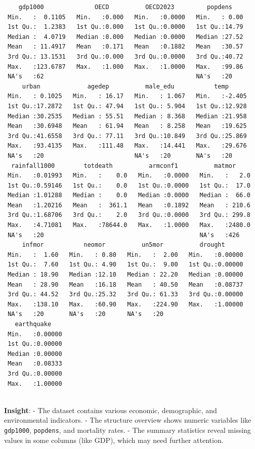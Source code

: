 \documentclass[
  letterpaper,
  DIV=11,
  numbers=noendperiod]{scrartcl}
\begin{document}
\begin{verbatim}
    gdp1000              OECD          OECD2023         popdens     
 Min.   :  0.1105   Min.   :0.000   Min.   :0.0000   Min.   : 0.00  
 1st Qu.:  1.2383   1st Qu.:0.000   1st Qu.:0.0000   1st Qu.:14.79  
 Median :  4.0719   Median :0.000   Median :0.0000   Median :27.52  
 Mean   : 11.4917   Mean   :0.171   Mean   :0.1882   Mean   :30.57  
 3rd Qu.: 13.1531   3rd Qu.:0.000   3rd Qu.:0.0000   3rd Qu.:40.72  
 Max.   :123.6787   Max.   :1.000   Max.   :1.0000   Max.   :99.86  
 NA's   :62                                          NA's   :20     
     urban             agedep          male_edu           temp       
 Min.   : 0.1025   Min.   : 16.17   Min.   : 1.067   Min.   :-2.405  
 1st Qu.:17.2872   1st Qu.: 47.94   1st Qu.: 5.904   1st Qu.:12.928  
 Median :30.2535   Median : 55.51   Median : 8.368   Median :21.958  
 Mean   :30.6948   Mean   : 61.94   Mean   : 8.258   Mean   :19.625  
 3rd Qu.:41.6558   3rd Qu.: 77.11   3rd Qu.:10.849   3rd Qu.:25.869  
 Max.   :93.4135   Max.   :111.48   Max.   :14.441   Max.   :29.676  
 NA's   :20                         NA's   :20       NA's   :20      
  rainfall1000        totdeath          armconf1          matmor      
 Min.   :0.01993   Min.   :    0.0   Min.   :0.0000   Min.   :   2.0  
 1st Qu.:0.59146   1st Qu.:    0.0   1st Qu.:0.0000   1st Qu.:  17.0  
 Median :1.01288   Median :    0.0   Median :0.0000   Median :  66.0  
 Mean   :1.20216   Mean   :  361.1   Mean   :0.1892   Mean   : 210.6  
 3rd Qu.:1.68706   3rd Qu.:    2.0   3rd Qu.:0.0000   3rd Qu.: 299.8  
 Max.   :4.71081   Max.   :78644.0   Max.   :1.0000   Max.   :2480.0  
 NA's   :20                                           NA's   :426     
     infmor           neomor          un5mor          drought       
 Min.   :  1.60   Min.   : 0.80   Min.   :  2.00   Min.   :0.00000  
 1st Qu.:  7.60   1st Qu.: 4.90   1st Qu.:  9.00   1st Qu.:0.00000  
 Median : 18.90   Median :12.10   Median : 22.20   Median :0.00000  
 Mean   : 28.90   Mean   :16.18   Mean   : 40.50   Mean   :0.08737  
 3rd Qu.: 44.52   3rd Qu.:25.32   3rd Qu.: 61.33   3rd Qu.:0.00000  
 Max.   :138.10   Max.   :60.90   Max.   :224.90   Max.   :1.00000  
 NA's   :20       NA's   :20      NA's   :20                        
   earthquake     
 Min.   :0.00000  
 1st Qu.:0.00000  
 Median :0.00000  
 Mean   :0.08333  
 3rd Qu.:0.00000  
 Max.   :1.00000  
                  
\end{verbatim}

\textbf{Insight}: - The dataset contains various economic, demographic,
and environmental indicators. - The structure overview shows numeric
variables like \texttt{gdp1000}, \texttt{popdens}, and mortality rates.
- The summary statistics reveal missing values in some columns (like
GDP), which may need further attention.
\end{document}
